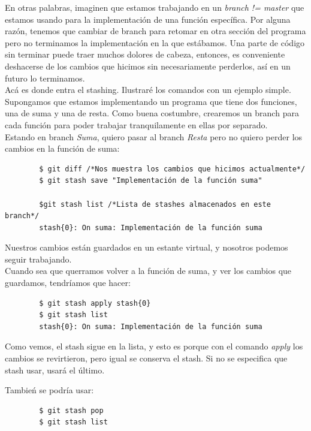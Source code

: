 \documentclass[a4paper, 12pt]{article}
\begin{document}
En otras palabras, imaginen que estamos trabajando en un \textit{branch != master} que estamos usando para la implementación de una función específica. Por alguna razón, tenemos que cambiar de branch para retomar en otra sección del programa pero no terminamos la implementación en la que estábamos. Una parte de código sin terminar puede traer muchos dolores de cabeza, entonces, es conveniente deshacerse de los cambios que hicimos sin necesariamente perderlos, así en un futuro lo terminamos.\\

Acá es donde entra el stashing. Ilustraré los comandos con un ejemplo simple.\\

Supongamos que estamos implementando un programa que tiene dos funciones, una de suma y una de resta. Como buena costumbre, crearemos un branch para cada función para poder trabajar tranquilamente en ellas por separado.\\

Estando en branch \textit{Suma}, quiero pasar al branch \textit{Resta} pero no quiero perder los cambios en la función de suma:

\begin{verbatim}
        $ git diff /*Nos muestra los cambios que hicimos actualmente*/
        $ git stash save "Implementación de la función suma"
        
        $git stash list /*Lista de stashes almacenados en este branch*/
        stash{0}: On suma: Implementación de la función suma
\end{verbatim}

Nuestros cambios están guardados en un estante virtual, y nosotros podemos seguir trabajando.\\
Cuando sea que querramos volver a la función de suma, y ver los cambios que guardamos, tendríamos que hacer:

\begin{verbatim}
        $ git stash apply stash{0}
        $ git stash list
        stash{0}: On suma: Implementación de la función suma
\end{verbatim}

Como vemos, el stash sigue en la lista, y esto es porque con el comando \textit{apply} los cambios se revirtieron, pero igual se conserva el stash. Si no se especifica que stash usar, usará el último.

Tambień se podría usar:

\begin{verbatim}
        $ git stash pop
        $ git stash list
\end{verbatim}
\end{document}
